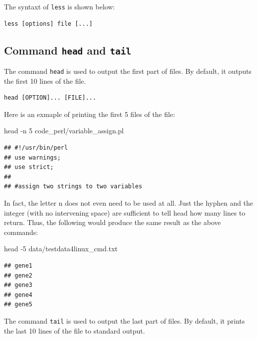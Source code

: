\documentclass[]{book}
\makeatletter
\newenvironment{Shaded}{\begin{snugshade}}{\end{snugshade}}
\newcommand{\FunctionTok}[1]{\textcolor[rgb]{0.00,0.00,0.00}{#1}}
\newcommand{\NormalTok}[1]{#1}
\newenvironment{kframe}{%
\medskip{}
\setlength{\fboxsep}{.8em}
 \def\at@end@of@kframe{}%
 \ifinner\ifhmode%
  \def\at@end@of@kframe{\end{minipage}}%
  \begin{minipage}{\columnwidth}%
 \fi\fi%
 \def\FrameCommand##1{\hskip\@totalleftmargin \hskip-\fboxsep
 \colorbox{shadecolor}{##1}\hskip-\fboxsep
     \hskip-\linewidth \hskip-\@totalleftmargin \hskip\columnwidth}%
 \MakeFramed {\advance\hsize-\width
   \@totalleftmargin\z@ \linewidth\hsize
   \@setminipage}}%
 {\par\unskip\endMakeFramed%
 \at@end@of@kframe}
\renewenvironment{Shaded}{\begin{kframe}}{\end{kframe}}
\makeatother
\begin{document}
The syntaxt of \texttt{less} is shown below:

\begin{verbatim}
less [options] file [...]
\end{verbatim}

\hypertarget{command-head-and-tail}{%
\subsection{\texorpdfstring{Command \texttt{head} and \texttt{tail}}{Command head and tail}}\label{command-head-and-tail}}

The command \texttt{head} is used to output the first part of files. By default, it outputs the first 10 lines of the file.

\begin{verbatim}
head [OPTION]... [FILE]...
\end{verbatim}

Here is an exmaple of printing the first 5 files of the file:

\begin{Shaded}
\begin{Highlighting}[]
\FunctionTok{head}\NormalTok{ -n 5 code_perl/variable_assign.pl}
\end{Highlighting}
\end{Shaded}

\begin{verbatim}
## #!/usr/bin/perl
## use warnings;
## use strict;
## 
## #assign two strings to two variables
\end{verbatim}

In fact, the letter n does not even need to be used at all. Just the hyphen and the integer (with no intervening space) are sufficient to tell head how many lines to return. Thus, the following would produce the same result as the above commands:

\begin{Shaded}
\begin{Highlighting}[]
\FunctionTok{head}\NormalTok{ -5 data/testdata4linux_cmd.txt}
\end{Highlighting}
\end{Shaded}

\begin{verbatim}
## gene1
## gene2
## gene3
## gene4
## gene5
\end{verbatim}

The command \texttt{tail} is used to output the last part of files. By default, it prints the last 10 lines of the file to standard output.
\end{document}
